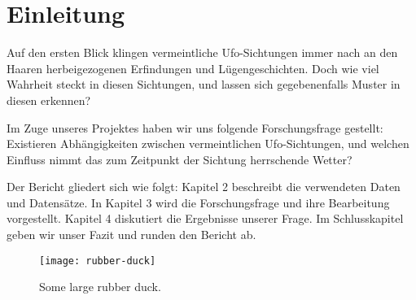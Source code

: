 \section{Einleitung} \label{einleitung}

Auf den ersten Blick klingen vermeintliche Ufo-Sichtungen immer nach an den Haaren herbeigezogenen Erfindungen und Lügengeschichten. Doch wie viel Wahrheit steckt in diesen Sichtungen, und lassen sich gegebenenfalls Muster in diesen erkennen?

Im Zuge unseres Projektes haben wir uns folgende Forschungsfrage gestellt: Existieren Abhängigkeiten zwischen vermeintlichen Ufo-Sichtungen, und welchen Einfluss nimmt das zum Zeitpunkt der Sichtung herrschende Wetter?

Der Bericht gliedert sich wie folgt: Kapitel 2 beschreibt die verwendeten Daten und Datensätze. In Kapitel 3 wird die Forschungsfrage und ihre Bearbeitung vorgestellt. Kapitel 4 diskutiert die Ergebnisse unserer Frage. Im Schlusskapitel geben wir unser Fazit und runden den Bericht ab.

\begin{figure}[t]
    \centering
    \texttt{[image: rubber-duck]}
    \caption{Some large rubber duck.}
    \label{rubber-duck}
\end{figure}
